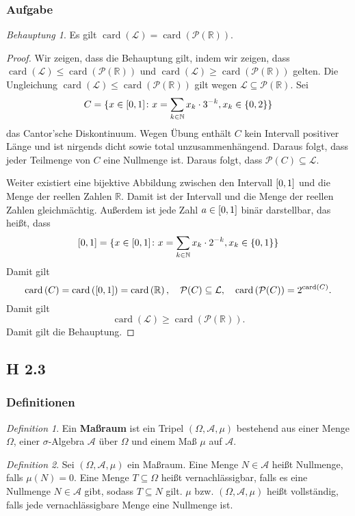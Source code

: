 \documentclass[draft,a5paper]{article}
\theoremstyle{remark}
\newtheorem*{Behauptung}{Behauptung}
\newtheorem*{Definition}{Definition}
\DeclareMathOperator{\card}{card}
\providecommand{\cardi}[1]{\card\left(#1\right)}
\begin{document}
\subsubsection{Aufgabe}
\begin{Behauptung}
  Es gilt \(\cardi{\mathcal{L}} = \cardi{\mathcal{P}(\mathbb{R})}\).
\end{Behauptung}
\begin{proof}
  Wir zeigen, dass die Behauptung gilt, indem wir zeigen, dass
  \(\cardi{\mathcal{L}} \le \cardi{\mathcal{P}(\mathbb{R})}\) und \(\cardi{\mathcal{L}} \ge \cardi{\mathcal{P}(\mathbb{R})}\) gelten.
  Die Ungleichung \(\cardi{\mathcal{L}} \le \cardi{\mathcal{P}(\mathbb{R})}\) gilt wegen \(\mathcal{L} \subseteq \mathcal{P}(\mathbb{R})\).
  Sei
  \[C = \{ x \in \interval{0}{1} \colon x = \sum_{k \in \mathbb{N}}{x_{k} \cdot 3^{-k}}, x_{k}
    \in \{0, 2\}\}\] das Cantor'sche Diskontinuum.  Wegen Übung enthält
  \(C\) kein Intervall positiver Länge und ist nirgends dicht sowie
  total unzusammenhängend. Daraus folgt, dass jeder Teilmenge von
  \(C\) eine Nullmenge ist.  Daraus folgt, dass \(\mathcal{P}(C) \subseteq \mathcal{L}\).

  Weiter existiert eine bijektive Abbildung zwischen den Intervall
  \(\interval{0}{1}\) und die Menge der reellen Zahlen \(\mathbb{R}\).  Damit ist
  der Intervall und die Menge der reellen Zahlen gleichmächtig.  
  Außerdem ist jede Zahl \(a \in \interval{0}{1}\) binär darstellbar, das
  heißt, dass
  \[\interval{0}{1} = \{ x \in \interval{0}{1}\colon x = \sum_{k\in \mathbb{N}}{x_{k} \cdot
      2^{-k}}, x_{k} \in \{0, 1\}\}\]
  Damit gilt
  \[\cardi{C} = \cardi{\interval{0}{1}} = \cardi{\mathbb{R}}, \quad \mathcal{P}(C) \subseteq \mathcal{L}, \quad
    \cardi{\mathcal{P}(C)} = 2^{\cardi{C}}.\]
  Damit gilt
  \[\card(\mathcal{L}) \ge \card(\mathcal{P}(\mathbb{R})). \]
  Damit gilt die Behauptung.
\end{proof}
\subsection{H 2.3}
\subsubsection{Definitionen}
\begin{Definition}
  Ein \textbf{Maßraum} ist ein Tripel \((\Omega, \mathcal{A}, \mu)\) bestehend aus einer
  Menge \(\Omega\), einer \(\sigma\)-Algebra \(\mathcal{A}\) über \(\Omega\) und einem Maß \(\mu\) auf \(\mathcal{A}\).
\end{Definition}
\begin{Definition}
  Sei \((\Omega, \mathcal{A}, \mu)\) ein Maßraum.  Eine Menge \(N \in \mathcal{A}\) heißt Nullmenge,
  falls \(\mu(N) = 0\).  Eine Menge \(T \subseteq \Omega\) heißt vernachlässigbar, falls
  es eine Nullmenge \(N \in \mathcal{A}\) gibt, sodass \(T \subseteq N\) gilt.
  \(\mu\) bzw. \((\Omega, \mathcal{A}, \mu)\) heißt vollständig, falls jede vernachlässigbare
  Menge eine Nullmenge ist.
\end{Definition}
\end{document}
